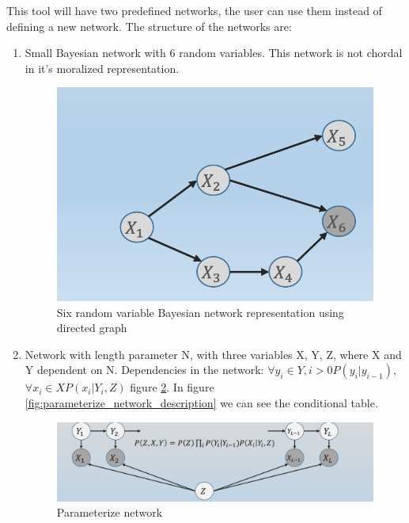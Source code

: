 \documentclass{article}
\begin{document}
    This tool will have two predefined networks, the user can use them instead of defining a new network. The structure of the networks are:
    \begin{enumerate}
        \item Small Bayesian network with 6 random variables. This network is not chordal in it's moralized representation.
        \begin{figure}[hb!]
            \includegraphics[width=\textwidth]{img/small_network.png}
            \centering
            \caption{Six random variable Bayesian network representation using directed graph}
            \label{fig:simple_network}
        \end{figure}
        \item Network with length parameter N, with three variables X, Y, Z, where X and Y dependent on N. Dependencies in the network: $\forall y_i \in Y, i>0 P(y_i | y_{i-1})$, $\forall x_i \in X P(x_i | Y_i, Z)$ figure \ref{fig:parameterized_network}. In figure \ref{fig:parameterize_network_description} we can see the conditional table.
        \begin{figure}[hb!]
            \includegraphics[width=\textwidth]{img/iterative_network.png}
            \centering
            \caption{Parameterize network}
            \label{fig:parameterized_network}
        \end{figure}

\end{enumerate}
\end{document}
